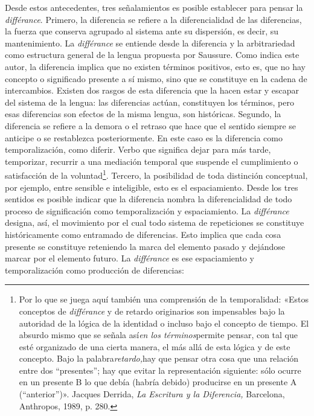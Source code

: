 Desde estos antecedentes, tres señalamientos es posible establecer para pensar la \emph{différance}. Primero, la diferencia se refiere a la diferencialidad de las diferencias, la fuerza que conserva agrupado al sistema ante su dispersión, es decir, su mantenimiento. La \emph{différance} se entiende desde la diferencia y la arbitrariedad como estructura general de la lengua propuesta por Saussure. Como indica este autor, la diferencia implica que no existen términos positivos, esto es, que no hay concepto o significado presente a sí mismo, sino que se constituye en la cadena de intercambios. Existen dos rasgos de esta diferencia que la hacen estar y escapar del sistema de la lengua: las diferencias actúan, constituyen los términos, pero esas diferencias son efectos de la misma lengua, son históricas. Segundo, la diferencia se refiere a la demora o el retraso que hace que el sentido siempre se anticipe o se restablezca posteriormente. En este caso es la diferencia como temporalización, como diferir. Verbo que significa dejar para más tarde, temporizar, recurrir a una mediación temporal que suspende el cumplimiento o satisfacción de la voluntad\footnote{Por lo que se juega aquí también una comprensión de la temporalidad: «Estos conceptos de \emph{différance} y de retardo originarios son impensables bajo la autoridad de la lógica de la identidad o incluso bajo el concepto de tiempo. El absurdo mismo que se señala así\emph{en los términos}permite pensar, con tal que esté organizado de una cierta manera, el más allá de esta lógica y de este concepto. Bajo la palabra\emph{retardo,}hay que pensar otra cosa que una relación entre dos ``presentes''; hay que evitar la representación siguiente: sólo ocurre en un presente B lo que debía (habría debido) producirse en un presente A (``anterior'')». Jacques Derrida, \emph{La Escritura y la Diferencia,} Barcelona, Anthropos, 1989, p. 280.}. Tercero, la posibilidad de toda distinción conceptual, por ejemplo, entre sensible e inteligible, esto es el espaciamiento. Desde los tres sentidos es posible indicar que la diferencia nombra la diferencialidad de todo proceso de significación como temporalización y espaciamiento. La \emph{différance} designa, así, el movimiento por el cual todo sistema de repeticiones se constituye históricamente como entramado de diferencias. Esto implica que cada cosa presente se constituye reteniendo la marca del elemento pasado y dejándose marcar por el elemento futuro. La \emph{différance} es ese espaciamiento y temporalización como producción de diferencias:

